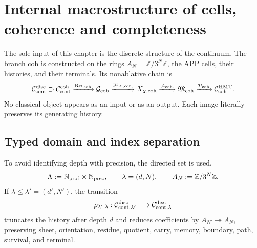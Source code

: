 \iffalse

\chapter{Internal macrostructure of cells, coherence and completeness}
\label{chap:pdfv2-coh-interna}

\begin{statusbox}
The sole input of this chapter is the discrete structure of the continuum. The
branch \(\mathrm{coh}\) is constructed on the rings
\(A_N=\mathbb Z/3^N\mathbb Z\), the APP cells, their histories, and their
terminals. Its nonablative chain is
\[
 \mathcal C_{\rm cont}^{\rm disc}
 \supset\mathcal C_{\rm cont}^{\rm coh}
 \xrightarrow{\operatorname{Res}_{\rm coh}}
 \mathcal G_{\rm coh}
 \xrightarrow{\operatorname{pr}_{X,{\rm coh}}}
 X_{\chi,{\rm coh}}
 \xrightarrow{\mathcal A_{\rm coh}}
 \mathfrak M_{\rm coh}
 \xrightarrow{\mathcal P_{\rm coh}}
 \mathcal C_{\rm coh}^{\rm HMT}.
\]
No classical object appears as an input or as an output. Each image literally preserves its generating history.
\end{statusbox}

\section{Typed domain and index separation}
\label{sec:pdfv2-coh-domain}

To avoid identifying depth with precision, the directed set is used.
\begin{equation}\label{eq:pdfv2-coh-lambda}
 \Lambda:=\mathbb N_{\rm prof}\times\mathbb N_{\rm prec},
 \qquad
 \lambda=(d,N),
 \qquad
 A_N:=\mathbb Z/3^N\mathbb Z.
\end{equation}
If \(\lambda\leq\lambda'=(d',N')\), the transition
\begin{equation}\label{eq:pdfv2-coh-rho-lambda}
 \rho_{\lambda',\lambda}:
 \mathcal C_{{\rm cont},\lambda'}^{\rm disc}
 \longrightarrow
 \mathcal C_{{\rm cont},\lambda}^{\rm disc}
\end{equation}
truncates the history after depth \(d\) and reduces coefficients by
\(A_{N'}\twoheadrightarrow A_N\), preserving sheet, orientation, residue,
quotient, carry, memory, boundary, path, survival, and terminal.

